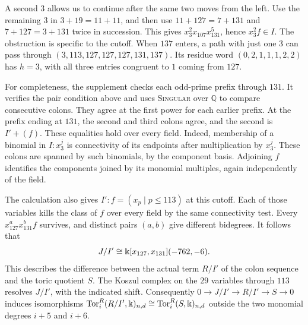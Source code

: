 \begin{example}
A second $3$ allows us to continue after the same two moves from the
left. Use the remaining $3$ in $3+19=11+11$, and then use
$11+127=7+131$ and $7+127=3+131$ twice in succession. This gives
$x_3^2x_{107}x_{131}^5$, hence $x_3^2f\in I$. The obstruction is
specific to the cutoff. When $137$ enters, a path with just one $3$
can pass through $(3,113,127,127,127,131,137)$. Its residue word
$(0,2,1,1,1,2,2)$ has $h=3$, with all three entries congruent to
$1$ coming from $127$.

For completeness, the supplement checks each odd-prime prefix through
$131$. It verifies the pair condition above and uses \textsc{Singular}
over $\mathbb Q$ to compare consecutive colons. They agree at the first
power for each earlier prefix. At the prefix ending at $131$, the second and third colons agree,
and the second is $I'+(f)$. These equalities hold over every field.
Indeed, membership of a binomial in $I:x_3^j$ is connectivity of its
endpoints after multiplication by $x_3^j$. These colons are spanned by
such binomials, by the component basis. Adjoining $f$ identifies the
components joined by its monomial multiples, again independently of
the field.

The calculation also gives $I':f=(x_p\mid p\le113)$ at this cutoff.
Each of those variables kills the class of $f$ over every field by
the same connectivity test. Every $x_{127}^a x_{131}^b f$ survives,
and distinct pairs $(a,b)$ give different bidegrees. It follows that
\[
 J/I'\cong\Bbbk[x_{127},x_{131}](-762,-6).
\]
This describes the difference between the actual term $R/I'$ of the
colon sequence and the toric quotient $S$. The Koszul complex on the
$29$ variables through $113$ resolves $J/I'$, with the indicated shift.
Consequently $0\to J/I'\to R/I'\to S\to0$ induces isomorphisms
$\operatorname{Tor}_i^R(R/I',\Bbbk)_{n,d}\cong\operatorname{Tor}_i^R(S,\Bbbk)_{n,d}$ outside the two
monomial degrees $i+5$ and $i+6$.
\end{example}


